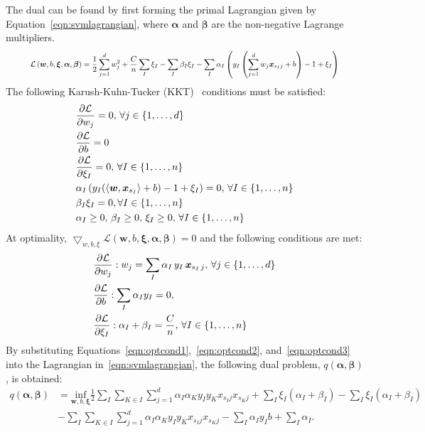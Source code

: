 The dual can be found by first forming the primal Lagrangian given by Equation~\ref{eqn:svmlagrangian}, where $\bm{\alpha}$ and $\bm{\beta}$ are the non-negative Lagrange multipliers.
\begin{equation}
\centering
\resizebox{.9\textwidth}{!}{$
\begin{aligned}
\label{eqn:svmlagrangian}
\mathcal{L}\left(\bm{w},b,\bm{\xi},\bm{\alpha},\bm{\beta}\right) = \frac{1}{2}\sum_{j=1}^d w_j^2  + \frac{C}{n}\sum_I \xi_I - \sum_I{\beta_I \xi_I} - \sum_I{\alpha_I\left(y_I\left(\sum_{j=1}^d w_j \bm x_{s_Ij} + b\right) -1 + \xi_I\right)}
\end{aligned}$}
\end{equation}
The following Karush-Kuhn-Tucker (KKT)~\citep{Boyd2004} conditions must be satisfied:
\begin{align*}
&\frac{\partial\mathcal{L}}{\partial w_j} = 0, \,\forall j \in \{1,\ldots,d\} \\
&\frac{\partial\mathcal{L}}{\partial b} = 0     \\
&\frac{\partial\mathcal{L}}{\partial\xi_I} = 0,\,\forall I \in {\left\{1,\ldots,n\right\}}\\
&\alpha_I\left(y_I(\langle\bm{w},\bm{x}_{s_I}\rangle + b)-1+\xi_{I}\right) = 0,\, \forall I \in {\left\{1,\ldots,n\right\}}\\
&\beta_I\xi_I = 0, \forall I \in {\left\{1,\ldots,n\right\}} \\
&\alpha_I \geq 0,\, \beta_I \geq 0,\, \xi_I \geq 0,\, \forall I \in {\left\{1,\ldots,n\right\}}
\end{align*}
At optimality, $\bigtriangledown_{w,b,\xi}\mathcal{L}(\bm{w},b,\bm{\xi},\bm{\alpha},\bm{\beta}) = 0$ and the following conditions are met:
\begin{align}
&\frac{\partial\mathcal{L}}{\partial w_j}: w_j = \sum_I{\alpha_I\,y_I\,\bm x_{s_I\,j}},\,\forall j \in \{1,\ldots,d\}\label{eqn:optcond1}\\
&\frac{\partial\mathcal{L}}{\partial b}: \sum_I{\alpha_Iy_I} = 0,\label{eqn:optcond2}\\
&\frac{\partial\mathcal{L}}{\partial\xi_I}: \alpha_I + \beta_I = \frac{C}{n},\,\forall I \in {\left\{1,\ldots,n\right\}}\label{eqn:optcond3}
\end{align}
By substituting Equations~\ref{eqn:optcond1},~\ref{eqn:optcond2}, and~\ref{eqn:optcond3} into the Lagrangian in~\ref{eqn:svmlagrangian}, the following dual problem, $q(\bm \alpha, \bm \beta)$, is obtained:
\begin{align*}
q(\bm \alpha, \bm \beta) &= \underset{\bm w, b, \bm \xi}{\text{ inf }} \frac{1}{2} \sum_I \sum_{K \in I} \sum_{j=1}^d \alpha_I \alpha_K y_I y_K  x_{s_I j} x_{s_K j} + \sum_I \xi_I \left( \alpha_I + \beta_I \right) - \sum_I \xi_I \left( \alpha_I + \beta_I \right) \\
{} & - \sum_I \sum_{K\in I} \sum_{j=1}^d \alpha_I \alpha_K y_I y_K  x_{s_I j} x_{s_K j} - \sum_I \alpha_I y_I b  + \sum_I \alpha_I.
\end{align*}

